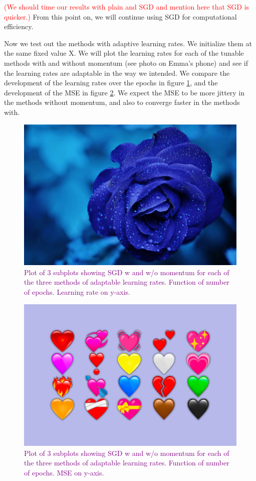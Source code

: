 \textcolor{red}{(We should time our results with plain and SGD and mention here that SGD is quicker.)} From this point on, we will continue using SGD for computational efficiency.

Now we test out the methods with adaptive learning rates. We initialize them at the same fixed value X. We will plot the learning rates for each of the tunable methods with and without momentum (see photo on Emma's phone) and see if the learning rates are adaptable in the way we intended. We compare the development of the learning rates over the epochs in figure \ref{fig:learningratesGD}, and the development of the MSE in figure \ref{fig:MSEGD}. We expect the MSE to be more jittery in the methods without momentum, and also to converge faster in the methods with.
\begin{figure}
    \centering
    \includegraphics[width=0.5\linewidth]{figures/placeholders/learningratesGD.png}
    \caption{\textcolor{purple}{Plot of 3 subplots showing SGD w and w/o momentum for each of the three methods of adaptable learning rates.  Function of number of epochs. Learning rate on y-axis.}}
    \label{fig:learningratesGD}
\end{figure}

\begin{figure}
    \centering
    \includegraphics[width=0.5\linewidth]{figures/placeholders/MSEGD.png}
    \caption{\textcolor{purple}{Plot of 3 subplots showing SGD w and w/o momentum for each of the three methods of adaptable learning rates.  Function of number of epochs. MSE on y-axis.}}
    \label{fig:MSEGD}
\end{figure}

